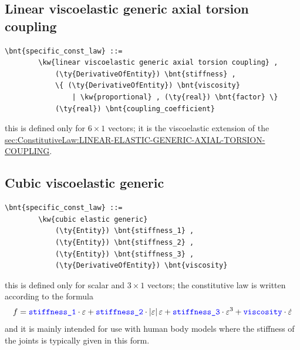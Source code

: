\subsection{Linear viscoelastic generic axial torsion coupling}
\begin{Verbatim}[commandchars=\\\{\}]
    \bnt{specific_const_law} ::= 
        \kw{linear viscoelastic generic axial torsion coupling} ,
            (\ty{DerivativeOfEntity}) \bnt{stiffness} ,
            \{ (\ty{DerivativeOfEntity}) \bnt{viscosity} 
                | \kw{proportional} , (\ty{real}) \bnt{factor} \}
            (\ty{real}) \bnt{coupling_coefficient}
\end{Verbatim}
this is defined only for $6 \times 1$ vectors; it is the viscoelastic 
extension of the 
\hyperref{\kw{linear elastic generic axial torsion coupling} constitutive law}{\kw{linear elastic generic axial torsion coupling} constitutive law (see Section~}{)}{sec:ConstitutiveLaw:LINEAR-ELASTIC-GENERIC-AXIAL-TORSION-COUPLING}.


\subsection{Cubic viscoelastic generic}
\begin{Verbatim}[commandchars=\\\{\}]
    \bnt{specific_const_law} ::= 
        \kw{cubic elastic generic}
            (\ty{Entity}) \bnt{stiffness_1} ,
            (\ty{Entity}) \bnt{stiffness_2} ,
            (\ty{Entity}) \bnt{stiffness_3} ,
            (\ty{DerivativeOfEntity}) \bnt{viscosity}
\end{Verbatim}
this is defined only for scalar and $3 \times 1$ vectors; the constitutive
law is written according to the formula
\begin{displaymath}
	f = \textcolor{blue}{\texttt{stiffness\_1}} \cdot \varepsilon
	+ \textcolor{blue}{\texttt{stiffness\_2}} \cdot \left| \varepsilon \right|\varepsilon
	+ \textcolor{blue}{\texttt{stiffness\_3}} \cdot \varepsilon^3
	+ \textcolor{blue}{\texttt{viscosity}} \cdot \dot{\varepsilon}
\end{displaymath}
and it is mainly intended for use with human body models 
where the stiffness of the joints is typically given in this form.

